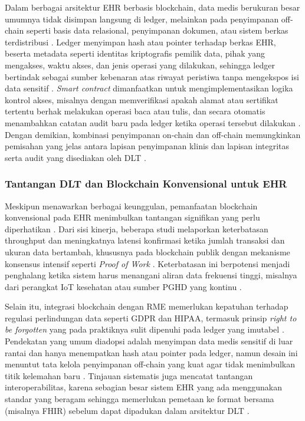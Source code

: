 Dalam berbagai arsitektur EHR berbasis blockchain, data medis berukuran besar umumnya tidak disimpan langsung di ledger, melainkan pada penyimpanan off-chain seperti basis data relasional, penyimpanan dokumen, atau sistem berkas terdistribusi \parencite{Ettaloui_2024_blockchain_ehr_slr,Mayer_2020_ehr_blockchain_slr}. 
Ledger menyimpan hash atau pointer terhadap berkas EHR, beserta metadata seperti identitas kriptografis pemilik data, pihak yang mengakses, waktu akses, dan jenis operasi yang dilakukan, sehingga ledger bertindak sebagai sumber kebenaran atas riwayat peristiwa tanpa mengekspos isi data sensitif \parencite{Yang_2021_blockchain_architecture_ehr,Rawat2025_Blockchain_Secure_EHR}. 
\emph{Smart contract} dimanfaatkan untuk mengimplementasikan logika kontrol akses, misalnya dengan memverifikasi apakah alamat atau sertifikat tertentu berhak melakukan operasi baca atau tulis, dan secara otomatis menambahkan catatan audit baru pada ledger ketika operasi tersebut dilakukan \parencite{Yang_2021_blockchain_architecture_ehr,Rawat2025_Blockchain_Secure_EHR}. 
Dengan demikian, kombinasi penyimpanan on-chain dan off-chain memungkinkan pemisahan yang jelas antara lapisan penyimpanan klinis dan lapisan integritas serta audit yang disediakan oleh DLT \parencite{Ettaloui_2024_blockchain_ehr_slr}. 

\subsubsection{Tantangan DLT dan Blockchain Konvensional untuk EHR}

Meskipun menawarkan berbagai keunggulan, pemanfaatan blockchain konvensional pada EHR menimbulkan tantangan signifikan yang perlu diperhatikan \parencite{Mayer_2020_ehr_blockchain_slr,Ettaloui_2024_blockchain_ehr_slr}. 
Dari sisi kinerja, beberapa studi melaporkan keterbatasan throughput dan meningkatnya latensi konfirmasi ketika jumlah transaksi dan ukuran data bertambah, khususnya pada blockchain publik dengan mekanisme konsensus intensif seperti \emph{Proof of Work} \parencite{Mayer_2020_ehr_blockchain_slr}. 
Keterbatasan ini berpotensi menjadi penghalang ketika sistem harus menangani aliran data frekuensi tinggi, misalnya dari perangkat IoT kesehatan atau sumber PGHD yang kontinu \parencite{Ettaloui_2024_blockchain_ehr_slr}. 

Selain itu, integrasi blockchain dengan RME memerlukan kepatuhan terhadap regulasi perlindungan data seperti GDPR dan HIPAA, termasuk prinsip \emph{right to be forgotten} yang pada praktiknya sulit dipenuhi pada ledger yang imutabel \parencite{Ettaloui_2024_blockchain_ehr_slr,Mayer_2020_ehr_blockchain_slr}. 
Pendekatan yang umum diadopsi adalah menyimpan data medis sensitif di luar rantai dan hanya menempatkan hash atau pointer pada ledger, namun desain ini menuntut tata kelola penyimpanan off-chain yang kuat agar tidak menimbulkan titik kelemahan baru \parencite{Yang_2021_blockchain_architecture_ehr}. 
Tinjauan sistematis juga mencatat tantangan interoperabilitas, karena sebagian besar sistem EHR yang ada menggunakan standar yang beragam sehingga memerlukan pemetaan ke format bersama (misalnya FHIR) sebelum dapat dipadukan dalam arsitektur DLT \parencite{Mayer_2020_ehr_blockchain_slr,Ettaloui_2024_blockchain_ehr_slr}. 

